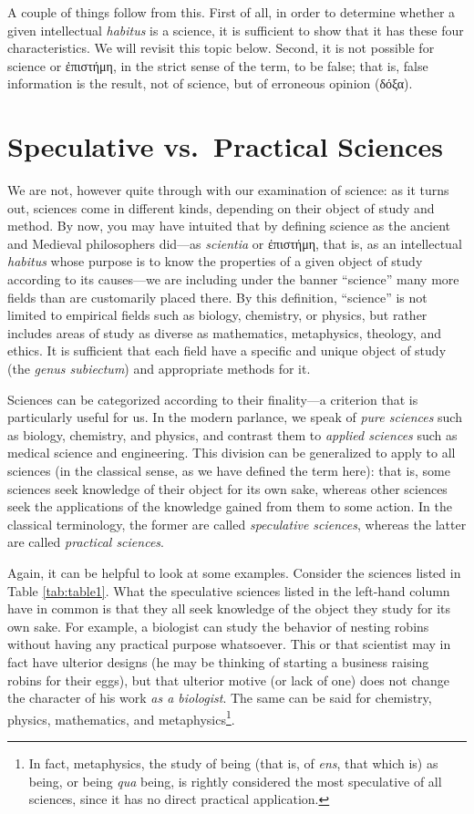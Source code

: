 \documentclass[
  12pt,
]{memoir}
\begin{document}
A couple of things follow from this. First of all, in order to determine
whether a given intellectual \emph{habitus} is a science, it is
sufficient to show that it has these four characteristics. We will
revisit this topic below. Second, it is not possible for science or
ἐπιστήμη, in the strict sense of the term, to be false; that is, false
information is the result, not of science, but of erroneous opinion
(δόξα).

\section{Speculative vs.~Practical
Sciences}\label{speculative-vs.-practical-sciences}

We are not, however quite through with our examination of science: as it
turns out, sciences come in different kinds, depending on their object
of study and method. By now, you may have intuited that by defining
science as the ancient and Medieval philosophers did---as
\emph{scientia} or ἐπιστήμη, that is, as an intellectual \emph{habitus}
whose purpose is to know the properties of a given object of study
according to its causes---we are including under the banner ``science''
many more fields than are customarily placed there. By this definition,
``science'' is not limited to empirical fields such as biology,
chemistry, or physics, but rather includes areas of study as diverse as
mathematics, metaphysics, theology, and ethics. It is sufficient that
each field have a specific and unique object of study (the \emph{genus
subiectum}) and appropriate methods for it.

Sciences can be categorized according to their finality---a criterion
that is particularly useful for us. In the modern parlance, we speak of
\emph{pure sciences} such as biology, chemistry, and physics, and
contrast them to \emph{applied sciences} such as medical science and
engineering. This division can be generalized to apply to all sciences
(in the classical sense, as we have defined the term here): that is,
some sciences seek knowledge of their object for its own sake, whereas
other sciences seek the applications of the knowledge gained from them
to some action. In the classical terminology, the former are called
\emph{speculative sciences}, whereas the latter are called
\emph{practical sciences}.

Again, it can be helpful to look at some examples. Consider the sciences
listed in Table \ref{tab:table1}. What the speculative sciences listed
in the left-hand column have in common is that they all seek knowledge
of the object they study for its own sake. For example, a biologist can
study the behavior of nesting robins without having any practical
purpose whatsoever. This or that scientist may in fact have ulterior
designs (he may be thinking of starting a business raising robins for
their eggs), but that ulterior motive (or lack of one) does not change
the character of his work \emph{as a biologist}. The same can be said
for chemistry, physics, mathematics, and metaphysics\footnote{In fact,
  metaphysics, the study of being (that is, of \emph{ens}, that which
  is) as being, or being \emph{qua} being, is rightly considered the
  most speculative of all sciences, since it has no direct practical
  application.}.
\end{document}
